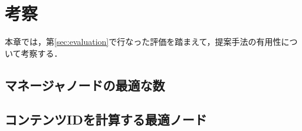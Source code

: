 \section{考察}
本章では，第\ref{sec:evaluation}で行なった評価を踏まえて，提案手法の有用性について考察する．
\subsection{マネージャノードの最適な数}

\subsection{コンテンツIDを計算する最適ノード}

